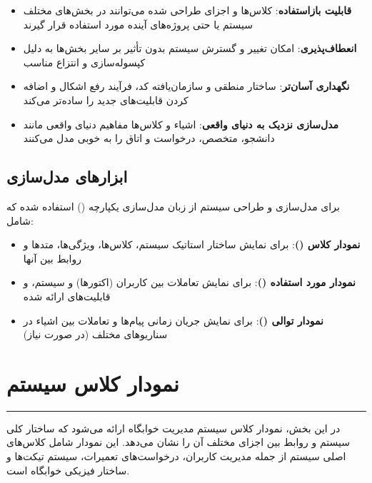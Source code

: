 \documentclass[12pt,a4paper]{report}
\begin{document}
	\begin{itemize}
		\item \textbf{قابلیت بازاستفاده}: کلاس‌ها و اجزای طراحی شده می‌توانند در بخش‌های مختلف سیستم یا حتی پروژه‌های آینده مورد استفاده قرار گیرند
		
		\item \textbf{انعطاف‌پذیری}: امکان تغییر و گسترش سیستم بدون تأثیر بر سایر بخش‌ها به دلیل کپسوله‌سازی و انتزاع مناسب
		
		\item \textbf{نگهداری آسان‌تر}: ساختار منطقی و سازمان‌یافته کد، فرآیند رفع اشکال و اضافه کردن قابلیت‌های جدید را ساده‌تر می‌کند
		
		\item \textbf{مدل‌سازی نزدیک به دنیای واقعی}: اشیاء و کلاس‌ها مفاهیم دنیای واقعی مانند دانشجو، متخصص، درخواست و اتاق را به خوبی مدل می‌کنند
	\end{itemize}
	\subsection{ابزارهای مدل‌سازی}
	
	برای مدل‌سازی و طراحی سیستم از زبان مدل‌سازی یکپارچه () استفاده شده که شامل:
	
	\begin{itemize}
		\item \textbf{نمودار کلاس ()}: برای نمایش ساختار استاتیک سیستم، کلاس‌ها، ویژگی‌ها، متدها و روابط بین آنها
		
		\item \textbf{نمودار مورد استفاده ()}: برای نمایش تعاملات بین کاربران (اکتورها) و سیستم، و قابلیت‌های ارائه شده
		
		\item \textbf{نمودار توالی ()}: برای نمایش جریان زمانی پیام‌ها و تعاملات بین اشیاء در سناریوهای مختلف (در صورت نیاز)
	\end{itemize}
	
	\section{نمودار کلاس سیستم}
	
	\noindent\rule{\textwidth}{0.4pt}
	
	در این بخش، نمودار کلاس سیستم مدیریت خوابگاه ارائه می‌شود که ساختار کلی سیستم و روابط بین اجزای مختلف آن را نشان می‌دهد. این نمودار شامل کلاس‌های اصلی سیستم از جمله مدیریت کاربران، درخواست‌های تعمیرات، سیستم تیکت‌ها و ساختار فیزیکی خوابگاه است.
	
\end{document}
